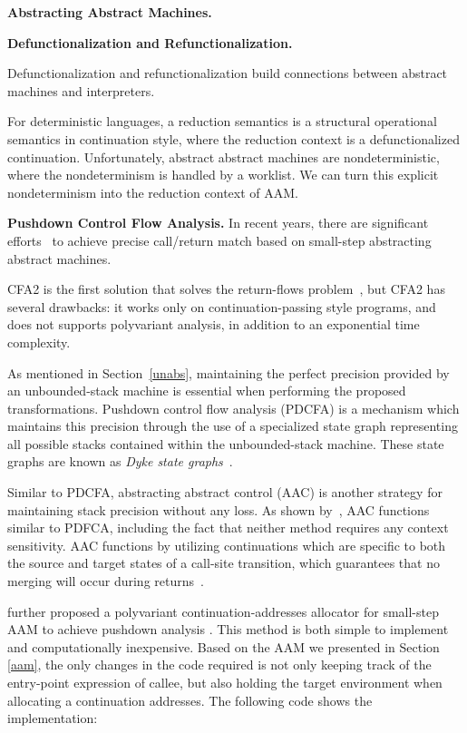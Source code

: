 \documentclass[acmsmall,review,anonymous]{acmart}\settopmatter{printfolios=true,printccs=false,printacmref=false}
\begin{document}
\textbf{Abstracting Abstract Machines.}

\textbf{Defunctionalization and Refunctionalization.}

Defunctionalization and refunctionalization build connections between abstract
machines and interpreters.

For deterministic languages, a reduction semantics is a structural operational
semantics in continuation style, where the reduction context is a
defunctionalized continuation.
Unfortunately, abstract abstract machines are nondeterministic, where
the nondeterminism is handled by a worklist.
We can turn this explicit nondeterminism into the reduction context of
AAM.


\textbf{Pushdown Control Flow Analysis.}
In recent years, there are significant efforts~\cite{vardoulakis2010cfa2, earl2012introspective,
gilray2016pushdown, johnson2015abstracting} to achieve precise call/return
match based on small-step abstracting abstract machines.

CFA2 is the first solution that solves the return-flows problem~\cite{vardoulakis2010cfa2},
but CFA2 has several drawbacks: it works only on continuation-passing style programs,
and does not supports polyvariant analysis, in addition to an exponential time
complexity.

As mentioned in Section~\ref{unabs}, maintaining the perfect precision provided by an unbounded-stack machine is essential when performing the proposed transformations. Pushdown control flow analysis (PDCFA) is a mechanism which maintains this precision through the use of a specialized state graph representing all possible stacks contained within the unbounded-stack machine. These state graphs are known as \emph{Dyke state graphs}~\cite{gilray2016pushdown}.

Similar to PDCFA, abstracting abstract control (AAC) is another strategy for maintaining stack precision without any loss. As shown by~\citeauthor{gilray2016pushdown}, AAC functions similar to PDFCA, including the fact that neither method requires any context sensitivity. AAC functions by utilizing continuations which are specific to both the source and target states of a call-site transition, which guarantees that no merging will occur during returns~\cite{gilray2016pushdown}.

\citeauthor{gilray2016pushdown} further proposed a polyvariant continuation-addresses allocator
for small-step AAM to achieve pushdown analysis \cite{gilray2016pushdown}.
This method is both simple to implement and computationally inexpensive.
Based on the AAM we presented in Section \ref{aam}, the only changes in the code required is
not only keeping track of the entry-point expression of callee, but also holding the target
environment when allocating a continuation addresses.
The following code shows the implementation:
\end{document}
